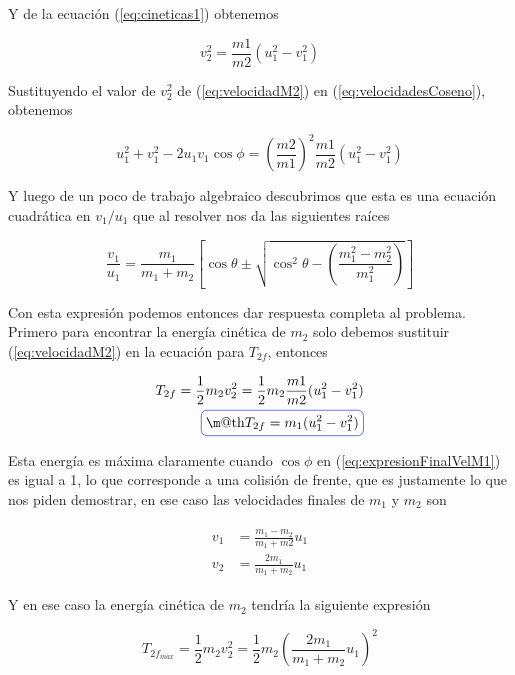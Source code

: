 \documentclass[a4paper,10pt]{article}
\makeatletter
\numberwithin{equation}{section}
\newcommand*{\boxcolor}{blue}
\renewcommand{\boxed}[1]{\textcolor{\boxcolor}{%
\tikz[baseline={([yshift=-1ex]current bounding box.center)}] \node [rectangle, minimum width=1ex,rounded corners,draw] {\normalcolor\m@th$\displaystyle#1$};}}
\makeatother
\begin{document}
Y de la ecuación (\ref{eq:cineticas1}) obtenemos

\begin{equation}
 v_2^2 = \frac{m1}{m2}(u_1^2 - v_1^2)
 \label{eq:velocidadM2}
\end{equation}

Sustituyendo el valor de $v_2^2$ de (\ref{eq:velocidadM2}) en (\ref{eq:velocidadesCoseno}),
obtenemos

\begin{equation}
 u_1^2 + v_1^2 - 2 u_1 v_1 \cos{\phi} = \left(\frac{m2}{m1} \right)^2 \frac{m1}{m2} (u_1^2 - v_1^2)
\end{equation}

Y luego de un poco de trabajo algebraico descubrimos que esta es una ecuación cuadrática
en $v_1/u_1$ que al resolver nos da las siguientes raíces

\begin{equation}
 \frac{v_1}{u_1} = \frac{m_1}{m_1+m_2}\left[\cos{\theta} \pm \sqrt{\cos^2{\theta} - \left(\frac{m_1^2 - m_2^2}{m_1^2} \right)} \right]
\label{eq:expresionFinalVelM1}
 \end{equation}

Con esta expresión podemos entonces dar respuesta completa al problema. Primero para 
encontrar la energía cinética de $m_2$ solo debemos sustituir (\ref{eq:velocidadM2}) en la
ecuación para $T_{2f}$, entonces

\begin{align}
 T_{2f} = \frac{1}{2} m_2 v_2^2 = \frac{1}{2} m_2 \frac{m1}{m2}(u_1^2 - v_1^2) \\
 \boxed{T_{2f} = m_1 (u_1^2 - v_1^2)}
\end{align}

Esta energía es máxima claramente cuando $\cos{\phi}$ en (\ref{eq:expresionFinalVelM1}) es
igual a 1, lo que corresponde a una colisión de frente, que es justamente lo que nos piden
demostrar, en ese caso las velocidades finales de $m_1$ y $m_2$ son

\begin{align}
 \begin{split}
  v_1 &= \frac{m_1 - m_2}{m_1 + m2} u_1 \\
  v_2 &= \frac{2 m_1}{m_1 + m_2} u_1
 \end{split}
\end{align}

Y en ese caso la energía cinética de $m_2$ tendría la siguiente expresión

\begin{equation}
 T_{2f_{max}} = \frac{1}{2} m_2 v_2^2 = \frac{1}{2} m_2 \left(\frac{2 m_1 }{m_1 + m_2} u_1\right)^2
\end{equation}
\end{document}

